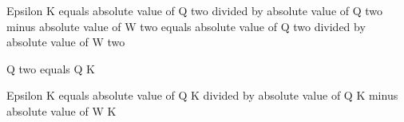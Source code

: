 Epsilon K equals absolute value of Q two divided by absolute value of Q two minus absolute value of W two equals absolute value of Q two divided by absolute value of W two  

Q two equals Q K  

Epsilon K equals absolute value of Q K divided by absolute value of Q K minus absolute value of W K
